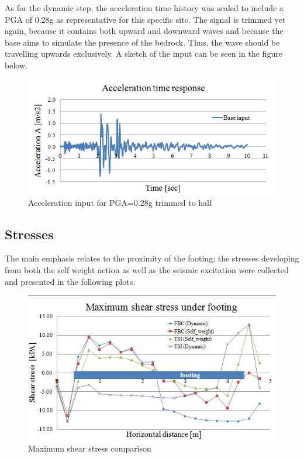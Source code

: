 As for the dynamic step, the acceleration time history was scaled to include a PGA of 0.28g as representative for this specific site. The signal is trimmed yet again, because it contains both upward and downward waves and because the base aims to simulate the presence of the bedrock. Thus, the wave should be travelling upwards exclusively. A sketch of the input can be seen in the figure below.

		\begin{figure}[!h]
			\centering
			\includegraphics[width=0.9\linewidth]{"input_acc"}
			\caption{Acceleration input for PGA=0.28g trimmed to half}
			\label{inputacc}
		\end{figure}
		
\newpage
\subsection{Stresses}

The main emphasis relates to the proximity of the footing; the stresses developing from both the self weight action as well as the seismic excitation were collected and presented in the following plots. 
\begin{figure}[!h]
	\centering
	\includegraphics[width=0.7\linewidth]{"shear stress"}
	\caption{Maximum shear stress comparison}
	\label{shearrr}
\end{figure}

